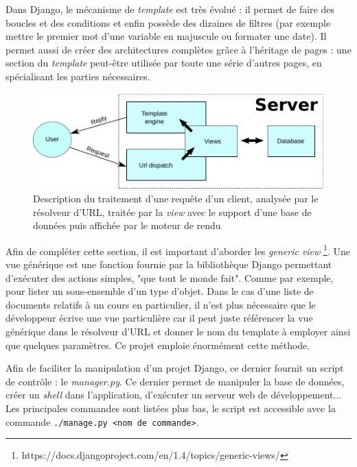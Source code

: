 \documentclass[a4paper,12pt]{article}
\begin{document}
Dans Django, le mécanisme de \textit{template} est très évolué : il permet
de faire des boucles et des conditions et enfin possède des dizaines de filtres (par
exemple mettre le premier mot d'une variable en majuscule ou formater une date).
Il permet aussi de créer des architectures complètes grâce à l'héritage de pages :
une section du \textit{template} peut-être utilisée par toute une série d'autres
pages, en spécialisant les parties nécessaires.

\begin{figure}
  \centering\includegraphics[scale=0.8]{imgs/mvc.pdf}
  \caption{Description du traitement d'une requête d'un client, analysée par
           le résolveur d'URL, traitée par la \textit{view} avec le support
           d'une base de données puis affichée par le moteur de rendu}
  \label{fig:mvc}
\end{figure}

Afin de compléter cette section, il est important d'aborder les \textit{generic view}
\footnote{https://docs.djangoproject.com/en/1.4/topics/generic-views/}.
Une vue générique est une fonction fournie par la bibliothèque Django permettant
d'exécuter des actions simples, "que tout le monde fait". Comme par exemple, pour lister
un sous-ensemble d'un type d'objet. Dans
le cas d'une liste de documents relatifs à un cours en particulier, il n'est plus nécessaire que le développeur
écrive une vue particulière car il peut juste référencer la vue
générique dans le résolveur d'URL et donner le nom du template à employer
ainsi que quelques paramètres. Ce projet emploie énormément cette méthode. 

Afin de faciliter la manipulation d'un projet Django, ce dernier fournit un script
de contrôle : le \textit{manager.py}. Ce dernier permet de manipuler la base de
données, créer un \textit{shell} dans l'application, d'exécuter un serveur
web de développement... Les principales commandes sont listées plus bas, le
script est accessible avec la commande \texttt{./manage.py <nom de commande>}.
\end{document}
